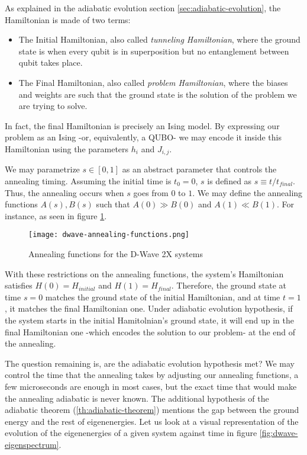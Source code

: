 As explained in the adiabatic evolution section \ref{sec:adiabatic-evolution}, the Hamiltonian is made of two terms:

\begin{itemize}
	\item The Initial Hamiltonian, also called \emph{tunneling Hamiltonian}, where the ground state is when every qubit is in superposition but no entanglement between qubit takes place.
	\item The Final Hamiltonian, also called \emph{problem Hamiltonian}, where the biases and weights are such that the ground state is the solution of the problem we are trying to solve.
\end{itemize}

In fact, the final Hamiltonian is precisely an Ising model. By expressing our problem as an Ising -or, equivalently, a QUBO- we may encode it inside this Hamiltonian using the parameters $h_i$ and $J_{i,j}$.

We may parametrize $s \in [0,1]$ as an abstract parameter that controls the annealing timing. Assuming the initial time is $t_0 = 0$, $s$ is defined as $s \equiv t / t_{final}$. Thus, the annealing occurs when $s$ goes from $0$ to $1$. We may define the annealing functions $A(s), B(s)$ such that $A(0) \gg B(0)$ and $A(1) \ll B(1)$. For instance, as seen in figure \ref{fig:dwave-annealing-functions}.

\begin{figure}[h]
	\texttt{[image: dwave-annealing-functions.png]}
	\centering
	\caption{Annealing functions for the D-Wave 2X systems \cite{DWaveDoc-QuantumAnnealing}}
	\label{fig:dwave-annealing-functions}
\end{figure}

With these restrictions on the annealing functions, the system's Hamiltonian satisfies $H(0) = H_{initial}$ and $H(1) = H_{final}$. Therefore, the ground state at time $s=0$ matches the ground state of the initial Hamiltonian, and at time $t=1$, it matches the final Hamiltonian one. Under adiabatic evolution hypothesis, if the system starts in the initial Hamitolnian's ground state, it will end up in the final Hamiltonian one -which encodes the solution to our problem- at the end of the annealing.

The question remaining is, are the adiabatic evolution hypothesis met? We may control the time that the annealing takes by adjusting our annealing functions, a few microseconds are enough in most cases, but the exact time that would make the annealing adiabatic is never known. The additional hypothesis of the adiabatic theorem (\ref{th:adiabatic-theorem}) mentions the gap between the ground energy and the rest of eigenenergies. Let us look at a visual representation of the evolution of the eigenenergies of a given system against time in figure \ref{fig:dwave-eigenspectrum}.

